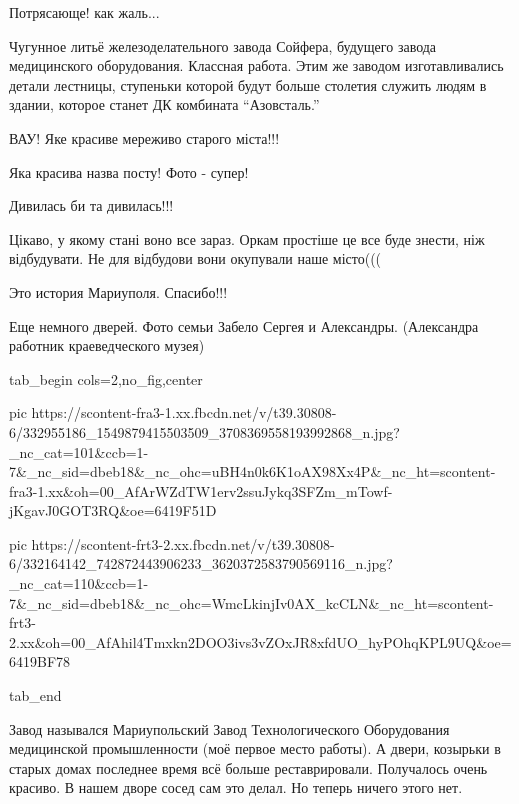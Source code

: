  
 
 
 
 

\qqSecCmt


Потрясающе! как жаль...


Чугунное литьё железоделательного завода Сойфера, будущего завода медицинского
оборудования. Классная работа. Этим же заводом изготавливались детали лестницы,
ступеньки которой будут больше столетия служить людям в здании, которое станет
ДК комбината \enquote{Азовсталь.}


ВАУ! Яке красиве мереживо старого міста!!!

Яка красива назва посту! Фото - супер!

Дивилась би та дивилась!!!


Цікаво, у якому стані воно все зараз. Оркам простіше це все буде знести, ніж
відбудувати. Не для відбудови вони окупували наше місто(((


Это история Мариуполя. Спасибо!!!


Еще немного дверей. Фото семьи Забело Сергея и Александры. (Александра работник
краеведческого музея)

\ifcmt
  tab_begin cols=2,no_fig,center

    pic https://scontent-fra3-1.xx.fbcdn.net/v/t39.30808-6/332955186_1549879415503509_3708369558193992868_n.jpg?_nc_cat=101&ccb=1-7&_nc_sid=dbeb18&_nc_ohc=uBH4n0k6K1oAX98Xx4P&_nc_ht=scontent-fra3-1.xx&oh=00_AfArWZdTW1erv2ssuJykq3SFZm_mTowf-jKgavJ0GOT3RQ&oe=6419F51D

    pic https://scontent-frt3-2.xx.fbcdn.net/v/t39.30808-6/332164142_742872443906233_3620372583790569116_n.jpg?_nc_cat=110&ccb=1-7&_nc_sid=dbeb18&_nc_ohc=WmcLkinjIv0AX_kcCLN&_nc_ht=scontent-frt3-2.xx&oh=00_AfAhil4Tmxkn2DOO3ivs3vZOxJR8xfdUO_hyPOhqKPL9UQ&oe=6419BF78

  tab_end
\fi


Завод назывался Мариупольский Завод Технологического Оборудования медицинской
промышленности (моё первое место работы). А двери, козырьки в старых домах
последнее время всё больше реставрировали. Получалось очень красиво. В нашем
дворе сосед сам это делал. Но теперь ничего этого нет.


